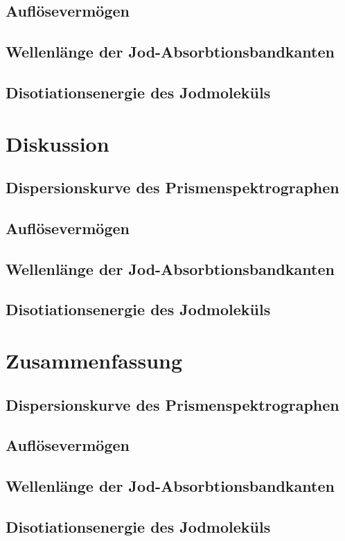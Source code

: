 \documentclass[12pt,english,ngerman]{scrartcl}
\begin{document}
\subsection{Auflösevermögen}


\subsection{Wellenlänge der Jod-Absorbtionsbandkanten}


\subsection{Disotiationsenergie des Jodmoleküls}


\section{Diskussion}\label{sec:disk}


\subsection{Dispersionskurve des Prismenspektrographen}


\subsection{Auflösevermögen}


\subsection{Wellenlänge der Jod-Absorbtionsbandkanten}


\subsection{Disotiationsenergie des Jodmoleküls}


\section{Zusammenfassung}\label{sec:zs}


\subsection{Dispersionskurve des Prismenspektrographen}


\subsection{Auflösevermögen}


\subsection{Wellenlänge der Jod-Absorbtionsbandkanten}


\subsection{Disotiationsenergie des Jodmoleküls}
\end{document}
